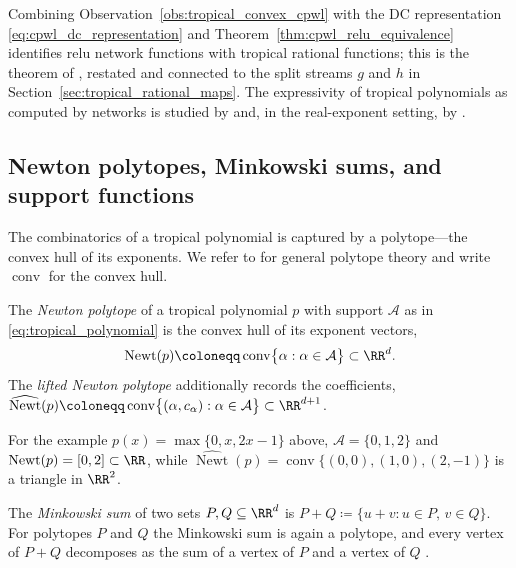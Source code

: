 Combining Observation~\ref{obs:tropical_convex_cpwl} with the DC representation \eqref{eq:cpwl_dc_representation} and Theorem~\ref{thm:cpwl_relu_equivalence} identifies \ac{relu} network functions with tropical rational functions; this is the theorem of \textcite{Zhang2018}, restated and connected to the split streams $g$ and $h$ in Section~\ref{sec:tropical_rational_maps}. The expressivity of tropical polynomials as computed by networks is studied by \textcite{Misiakos2022neural} and, in the real-exponent setting, by \textcite{Brandenburg2024b}.

\subsection*{Newton polytopes, Minkowski sums, and support functions}

The combinatorics of a tropical polynomial is captured by a polytope---the convex hull of its exponents. We refer to \textcite{Ziegler1995} for general polytope theory and write $\operatorname{conv}$ for the convex hull.

\begin{definition}\label{def:newton_polytope}
The \emph{Newton polytope} of a tropical polynomial $p$ with support $\mathcal{A}$ as in \eqref{eq:tropical_polynomial} is the convex hull of its exponent vectors,
\begin{equation}
	\operatorname{Newt}(p) \coloneqq \operatorname{conv}\bigl\{ \alpha : \alpha \in \mathcal{A} \bigr\} \subset \RR^{d}.
	\label{eq:newton_polytope}
\end{equation}
The \emph{lifted Newton polytope} additionally records the coefficients,
$\widehat{\operatorname{Newt}}(p) \coloneqq \operatorname{conv}\bigl\{ (\alpha, c_{\alpha}) : \alpha \in \mathcal{A} \bigr\} \subset \RR^{d+1}$.
\end{definition}

For the example $p(x) = \max\{0, x, 2x-1\}$ above, $\mathcal{A} = \{0, 1, 2\}$ and $\operatorname{Newt}(p) = [0, 2] \subset \RR$, while $\widehat{\operatorname{Newt}}(p) = \operatorname{conv}\{(0,0), (1,0), (2,-1)\}$ is a triangle in $\RR^2$.

\begin{definition}\label{def:minkowski_sum}
The \emph{Minkowski sum} of two sets $P, Q \subseteq \RR^{d}$ is $P + Q \coloneqq \{ u + v : u \in P,\, v \in Q \}$. For polytopes $P$ and $Q$ the Minkowski sum is again a polytope, and every vertex of $P + Q$ decomposes as the sum of a vertex of $P$ and a vertex of $Q$ \parencite{Ziegler1995}.
\end{definition}

